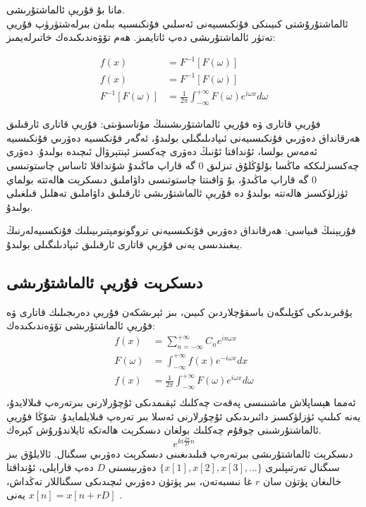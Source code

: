 مانا بۇ فۇريې ئالماشتۇرىشى.\\
ئالماشتۇرۇشتى كىيىنكى فۇنكىسىيەنى ئەسلىي فۇنكىسىيە بىلەن بىرلەشتۈرۈپ فۇريې تەتۈر ئالماشتۇرىشى دەپ ئاتايمىز.  ھەم تۆۋەندىكىدەك خاتىرلەيمىز:

\begin{align*}
f(x) &= F^{-1}[F(\omega)] \\
f(x) &= F^{-1}[F(\omega)] \\
F^{-1}[F(\omega)] &= \frac{1}{2 \pi} \int_{-\infty}^{+\infty}F(\omega)e^{i \omega x}d\omega
\end{align*}

فۇريې قاتارى ۋە فۇريې ئالماشتۇرىشىنىڭ مۇناسىۋىتى: فۇريې قاتارى ئارقىلىق ھەرقانداق دەۋرىي فۇنكىسىيەنى ئىپادىلىگىلى بولىدۇ، ئەگەر فۇنكسىيە دەۋرىي فۇنكىسىيە ئەمەس بولسا، ئۇنداقتا ئۇنىڭ دەۋرى چەكسىز ئېنتېرۋال ئىچىدە بولىدۇ. دەۋرى چەكسىزلىككە ماڭسا بۇلۇڭلۇق تىزلىق 0 گە قاراپ ماڭىدۇ شۇنداقلا ئاساس چاستوتىسى 0 گە قاراپ ماڭىدۇ، بۇ ۋاقىتتا چاستوتىسى داۋاملىق دىسكرېت ھالەتتە بولماي ئۈزلۈكسىز ھالەتتە بولىدۇ دە فۇريې ئالماشتۇرىشى ئارقىلىق داۋاملىق تەھلىل قىلغىلى بولىدۇ.

\begin{colorful}[red]
فۇريېنىڭ قىياسى: ھەرقانداق دەۋرىي فۇنكىسىيەنى تروگونومېتىرىيىلىك فۇنكسىيەلەرنىڭ يىغىندىسى يەنى فۇريې قاتارى ئارقىلىق ئىپادىلىگىلى بولىدۇ.
\end{colorful}

\subsection{دىسكرېت فۇريې ئالماشتۇرىشى}
يۇقىرىدىكى كۆپلىگەن باسقۇچلاردىن كىيىن، بىز ئېرىشكەن فۇريې دەرىجىلىك قاتارى ۋە فۇريې ئالماشتۇرىشى تۆۋەندىكىدەك:
\begin{align*}
f(x) &= \sum_{n=-\infty}^{+\infty}C_n e^{in \omega x} \\
F(\omega) &= \int_{-\infty}^{+\infty} f(x)e^{-i\omega x}dx \\
f(x) &= \frac{1}{2 \pi} \int_{-\infty}^{+\infty}F(\omega)e^{i \omega x}d\omega\\
\end{align*}
ئەمما ھېساپلاش ماشىنىسى پەقەت چەكلىك ئېقىمدىكى ئۇچۇرلارنى بىرتەرەپ قىلالايدۇ، يەنە كىلىپ ئۈزلۈكسىز دائىرىدىكى ئۇچۇرلارنى ئەسلا بىر تەرەپ قىلايلمايدۇ. شۇڭا فۇريې ئالماشتۇرشىنى چوقۇم چەكلىك بولغان دىسكرېت ھالەتكە ئايلاندۇرۇش كېرەك.
$$e^{ki \frac{2 \pi}{D} n}$$
دىسكرېت ئالماشتۇرىشى بىرتەرەپ قىلىدىغىنى دىسكرېت دەۋرىي سىگنال. ئالايلۇق بىز سىگنال تەرتىپلىرى $\{ x[1],x[2],x[3],... \}$ دەۋرىيسىنى $D$ دەپ قارايلى، ئۇنداقتا خالىغان پۈتۈن سان $r$ غا نىسبەتەن، بىر پۈتۈن دەۋرىي ئىچىدىكى سىگناللار تەڭداش، يەنى $x[n] = x[n+rD]$ .

